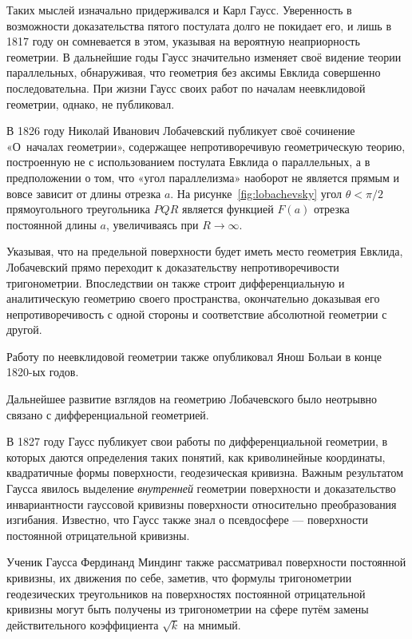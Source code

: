\documentclass{article}
\numberwithin{equation}{section}
\begin{document}
Таких мыслей изначально придерживался и Карл Гаусс. Уверенность в
возможности доказательства пятого постулата долго не покидает его, и
лишь в 1817 году он сомневается в этом, указывая на вероятную
неаприорность геометрии. В дальнейшие годы Гаусс значительно изменяет
своё видение теории параллельных, обнаруживая, что геометрия без
аксимы Евклида совершенно последовательна. При жизни Гаусс своих работ
по началам неевклидовой геометрии, однако, не публиковал.

В 1826 году Николай Иванович Лобачевский публикует своё сочинение
«О началах геометрии», содержащее непротиворечивую геометрическую
теорию, построенную не с использованием постулата Евклида о
параллельных, а в предположении о том, что «угол параллелизма»
наоборот не является прямым и вовсе зависит от длины отрезка $a$. На
рисунке \ref{fig:lobachevsky} угол $\theta < \pi/2$ прямоугольного
треугольника $PQR$ является функцией $F(a)$ отрезка постоянной длины
$a$, увеличиваясь при $R \to \infty$.



Указывая, что на предельной поверхности будет иметь место геометрия
Евклида, Лобачевский прямо переходит к доказательству
непротиворечивости тригонометрии. Впоследствии он также строит
дифференциальную и аналитическую геометрию своего пространства,
окончательно доказывая его непротиворечивость с одной стороны и
соответствие абсолютной геометрии с другой.

Работу по неевклидовой геометрии также опубликовал Янош Больаи в конце
1820-ых годов.

Дальнейшее развитие взглядов на геометрию Лобачевского было неотрывно
связано с дифференциальной геометрией.

В 1827 году Гаусс публикует свои работы по дифференциальной геометрии,
в которых даются определения таких понятий, как криволинейные
координаты, квадратичные формы поверхности, геодезическая кривизна.
Важным результатом Гаусса явилось выделение \emph{внутренней}
геометрии поверхности и доказательство инвариантности гауссовой
кривизны поверхности относительно преобразования изгибания. Известно,
что Гаусс также знал о псевдосфере — поверхности постоянной
отрицательной кривизны.

Ученик Гаусса Фердинанд Миндинг также рассматривал поверхности
постоянной кривизны, их движения по себе, заметив, что формулы
тригонометрии геодезических треугольников на поверхностях постоянной
отрицательной кривизны могут быть получены из тригонометрии на сфере
путём замены действительного коэффициента $\sqrt{k}$ на мнимый.
\end{document}
